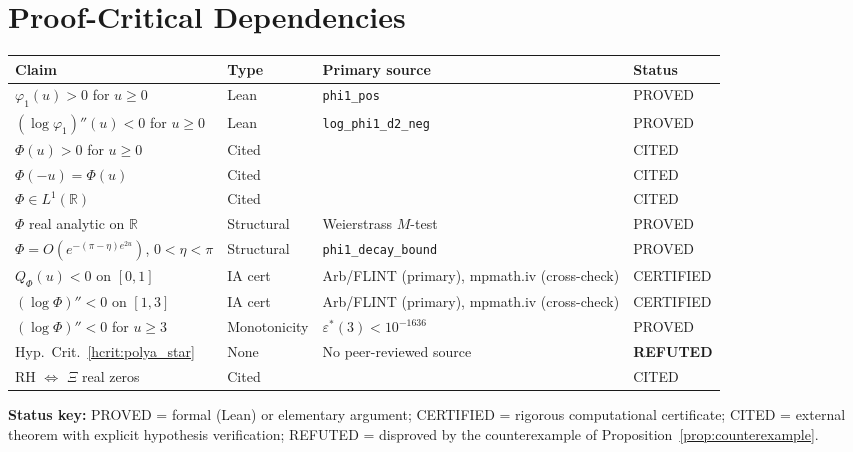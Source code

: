 \documentclass[11pt]{article}
\theoremstyle{definition}
\theoremstyle{remark}
\begin{document}
\section{Proof-Critical Dependencies}\label{sec:deps}

\begin{center}\footnotesize
\begin{tabular}{@{}p{4.0cm}p{2.2cm}p{3.8cm}l@{}}
\toprule
Claim & Type & Primary source & Status \\
\midrule
$\varphi_1(u) > 0$ for $u \geq 0$ & Lean & \texttt{phi1\_pos} & PROVED \\
$(\log\varphi_1)''(u) < 0$ for $u \geq 0$ & Lean & \texttt{log\_phi1\_d2\_neg} & PROVED \\
$\Phi(u) > 0$ for $u \geq 0$ & Cited & \cite[Thm.~A]{csordas1989} & CITED \\
$\Phi(-u) = \Phi(u)$ & Cited & \cite[\S2.10]{titchmarsh1986} & CITED \\
$\Phi \in L^1(\mathbb{R})$ & Cited & \cite[\S2.10]{titchmarsh1986} & CITED \\
$\Phi$ real analytic on $\mathbb{R}$ & Structural & Weierstrass $M$-test & PROVED \\
$\Phi = O(e^{-(\pi-\eta) e^{2u}})$, $0<\eta<\pi$ & Structural & \texttt{phi1\_decay\_bound} & PROVED \\
$Q_\Phi(u) < 0$ on $[0,1]$ & IA cert & Arb/FLINT (primary), mpmath.iv (cross-check) & CERTIFIED \\
$(\log\Phi)'' < 0$ on $[1,3]$ & IA cert & Arb/FLINT (primary), mpmath.iv (cross-check) & CERTIFIED \\
$(\log\Phi)'' < 0$ for $u \geq 3$ & Monotonicity & $\varepsilon^*(3)<10^{-1636}$ & PROVED \\
Hyp.\ Crit.~\ref{hcrit:polya_star} & None & No peer-reviewed source &
  \textbf{REFUTED} \\
RH $\Leftrightarrow$ $\Xi$ real zeros & Cited & \cite[\S2.1]{titchmarsh1986} & CITED \\
\bottomrule
\end{tabular}
\end{center}
\medskip

\noindent\textbf{Status key:}
PROVED = formal (Lean) or elementary argument;
CERTIFIED = rigorous computational certificate;
CITED = external theorem with explicit hypothesis verification;
REFUTED = disproved by the counterexample of
Proposition~\ref{prop:counterexample}.
\end{document}
